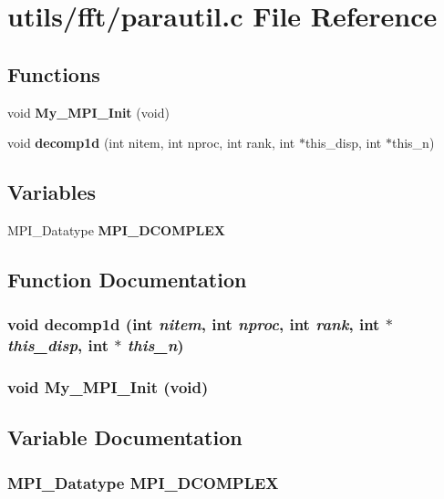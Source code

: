 \section{utils/fft/parautil.c File Reference}
\label{parautil_8c}
\subsection*{Functions}
\begin{CompactItemize}
\item 
void {\bf My\_\-MPI\_\-Init} (void)
\item 
void {\bf decomp1d} (int nitem, int nproc, int rank, int $\ast$this\_\-disp, int $\ast$this\_\-n)
\end{CompactItemize}
\subsection*{Variables}
\begin{CompactItemize}
\item 
MPI\_\-Datatype {\bf MPI\_\-DCOMPLEX}
\end{CompactItemize}


\subsection{Function Documentation}
\subsubsection{\setlength{\rightskip}{0pt plus 5cm}void decomp1d (int {\em nitem}, int {\em nproc}, int {\em rank}, int $\ast$ {\em this\_\-disp}, int $\ast$ {\em this\_\-n})}\label{parautil_8c_a429bcafcf774b5a4b95ac26f6029cb7}


\subsubsection{\setlength{\rightskip}{0pt plus 5cm}void My\_\-MPI\_\-Init (void)}\label{parautil_8c_e9f1b96e2031dddd3261cdd76b6f059e}




\subsection{Variable Documentation}
\subsubsection{\setlength{\rightskip}{0pt plus 5cm}MPI\_\-Datatype {\bf MPI\_\-DCOMPLEX}}\label{parautil_8c_8248504652d3b407b136726772e924c9}



